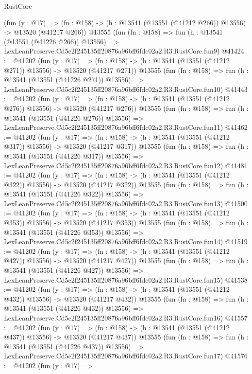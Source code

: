 \begin{lexlean}{RustCore}
\begin{coremodule}
    (fun (y : @17) =>
    (fn : @158) -> (h : @13541 (@13551 (@41212 @266)) @13556) -> @13520 (@41217 @266))
    @13555
    (fun (fn : @158) =>
    fun (h : @13541 (@13551 (@41226 @266)) @13556) =>
    LexLeanPreserve.Cd5c2f245135ff20876a96bff6fdc02a2.R3.RustCore.fun9)
@41424 := @41202
    (fun (y : @17) =>
    (fn : @158) -> (h : @13541 (@13551 (@41212 @271)) @13556) -> @13520 (@41217 @271))
    @13555
    (fun (fn : @158) =>
    fun (h : @13541 (@13551 (@41226 @271)) @13556) =>
    LexLeanPreserve.Cd5c2f245135ff20876a96bff6fdc02a2.R3.RustCore.fun10)
@41443 := @41202
    (fun (y : @17) =>
    (fn : @158) -> (h : @13541 (@13551 (@41212 @276)) @13556) -> @13520 (@41217 @276))
    @13555
    (fun (fn : @158) =>
    fun (h : @13541 (@13551 (@41226 @276)) @13556) =>
    LexLeanPreserve.Cd5c2f245135ff20876a96bff6fdc02a2.R3.RustCore.fun11)
@41462 := @41202
    (fun (y : @17) =>
    (fn : @158) -> (h : @13541 (@13551 (@41212 @317)) @13556) -> @13520 (@41217 @317))
    @13555
    (fun (fn : @158) =>
    fun (h : @13541 (@13551 (@41226 @317)) @13556) =>
    LexLeanPreserve.Cd5c2f245135ff20876a96bff6fdc02a2.R3.RustCore.fun12)
@41481 := @41202
    (fun (y : @17) =>
    (fn : @158) -> (h : @13541 (@13551 (@41212 @322)) @13556) -> @13520 (@41217 @322))
    @13555
    (fun (fn : @158) =>
    fun (h : @13541 (@13551 (@41226 @322)) @13556) =>
    LexLeanPreserve.Cd5c2f245135ff20876a96bff6fdc02a2.R3.RustCore.fun13)
@41500 := @41202
    (fun (y : @17) =>
    (fn : @158) -> (h : @13541 (@13551 (@41212 @353)) @13556) -> @13520 (@41217 @353))
    @13555
    (fun (fn : @158) =>
    fun (h : @13541 (@13551 (@41226 @353)) @13556) =>
    LexLeanPreserve.Cd5c2f245135ff20876a96bff6fdc02a2.R3.RustCore.fun14)
@41519 := @41202
    (fun (y : @17) =>
    (fn : @158) -> (h : @13541 (@13551 (@41212 @427)) @13556) -> @13520 (@41217 @427))
    @13555
    (fun (fn : @158) =>
    fun (h : @13541 (@13551 (@41226 @427)) @13556) =>
    LexLeanPreserve.Cd5c2f245135ff20876a96bff6fdc02a2.R3.RustCore.fun15)
@41538 := @41202
    (fun (y : @17) =>
    (fn : @158) -> (h : @13541 (@13551 (@41212 @432)) @13556) -> @13520 (@41217 @432))
    @13555
    (fun (fn : @158) =>
    fun (h : @13541 (@13551 (@41226 @432)) @13556) =>
    LexLeanPreserve.Cd5c2f245135ff20876a96bff6fdc02a2.R3.RustCore.fun16)
@41557 := @41202
    (fun (y : @17) =>
    (fn : @158) -> (h : @13541 (@13551 (@41212 @437)) @13556) -> @13520 (@41217 @437))
    @13555
    (fun (fn : @158) =>
    fun (h : @13541 (@13551 (@41226 @437)) @13556) =>
    LexLeanPreserve.Cd5c2f245135ff20876a96bff6fdc02a2.R3.RustCore.fun17)
@41576 := @41202
    (fun (y : @17) =>

\end{coremodule}
\end{lexlean}
